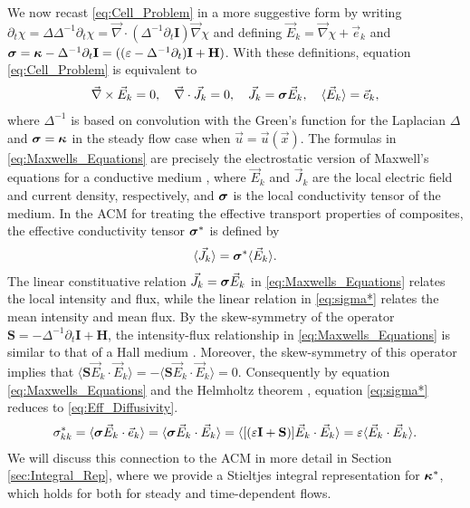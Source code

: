 \documentclass[11pt]{amsart}
\newcommand{\Hb}{\mathbf{H}}
\newcommand{\Ib}{\mathbf{I}}
\newcommand\bsig{\mbox{\boldmath${\sigma}$}}
\newcommand\bkappa{\mbox{\boldmath${\kappa}$}}
\begin{document}
We now recast \eqref{eq:Cell_Problem} 
in a more suggestive form by writing 
$\partial_t\chi=\Delta\Delta^{-1}\partial_t\chi=\vec{\nabla}\cdot(\Delta^{-1}\partial_t\Ib)\vec{\nabla}\chi$ and defining
$\vec{E}_k=\vec{\nabla}\chi+\vec{e}_k$ and 
$\bsig=\bkappa-\Delta^{-1}\partial_t\Ib=((\varepsilon-\Delta^{-1}\partial_t)\Ib+\Hb)$. With these
definitions, equation \eqref{eq:Cell_Problem} is equivalent to 
\cite{Fannjiang:SIAM_JAM:333}  
%
\begin{align}\label{eq:Maxwells_Equations}  
  \vec{\nabla}\times\vec{E}_k=0, \quad
  \vec{\nabla}\cdot\vec{J}_k=0, \quad  
  \vec{J}_k=\bsig\vec{E}_k,\quad
  \langle\vec{E}_k\rangle=\vec{e}_k,
\end{align}
%
where $\Delta^{-1}$ is based on convolution with the Green's function for
the Laplacian $\Delta$ and $\bsig=\bkappa$ in the steady flow
case when $\vec{u}=\vec{u}(\vec{x})$. The formulas in
\eqref{eq:Maxwells_Equations} are  
precisely the electrostatic version of Maxwell's equations for a
conductive medium \cite{Golden:CMP-473}, where $\vec{E}_k$ and
$\vec{J}_k$ are the local electric field and current density,
respectively, and $\bsig$ is the local conductivity tensor of the
medium. In the ACM for treating the effective transport properties of
composites, the effective conductivity tensor $\bsig^*$ is defined by 
%
\begin{align}\label{eq:sigma*}
  \langle\vec{J}_k\rangle=\bsig^*\langle\vec{E}_k\rangle.
\end{align}
%
The linear constituative relation $\vec{J}_k=\bsig\vec{E}_k$ in
\eqref{eq:Maxwells_Equations} relates the local intensity and flux,
while the linear relation in \eqref{eq:sigma*} relates the mean
intensity and mean flux. By the skew-symmetry of the operator
$\mathbf{S}=-\Delta^{-1}\partial_t\Ib+\Hb$, the intensity-flux relationship in
\eqref{eq:Maxwells_Equations} is similar to
that of a Hall medium \cite{Isichenko:JNS:1991:375}. Moreover, the
skew-symmetry of this operator implies that
$\langle\mathbf{S}\vec{E}_k\cdot\vec{E}_k\rangle=-\langle\mathbf{S}\vec{E}_k\cdot\vec{E}_k\rangle=0$. Consequently
by equation \eqref{eq:Maxwells_Equations} and the Helmholtz theorem
\cite{Golden:CMP-473,Denaro:2003:0271,Bhatia:IEE:1077}, equation \eqref{eq:sigma*} reduces to
\eqref{eq:Eff_Diffusivity}.    
%
\begin{align}
  \sigma^*_{kk}=\langle\bsig\vec{E}_k\cdot\vec{e}_k\rangle
       =\langle\bsig\vec{E}_k\cdot\vec{E}_k\rangle
       =\langle[(\varepsilon\Ib+\mathbf{S})]\vec{E}_k\cdot\vec{E}_k\rangle
       =\varepsilon\langle\vec{E}_k\cdot\vec{E}_k\rangle.
\end{align}
%
We will discuss this connection to the ACM in more detail in Section
\ref{sec:Integral_Rep}, where we provide a Stieltjes integral
representation for $\bkappa^*$, which holds for both for steady and
time-dependent flows. 
\end{document}
